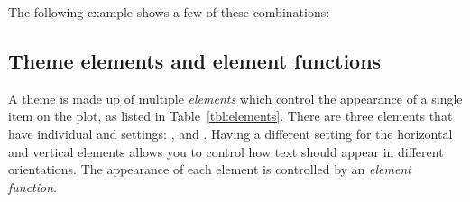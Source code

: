 \noindent The following example shows a few of these combinations:

% 
% 
% 
% 


\subsection{Theme elements and element functions}
\label{sec:theme_elements}

A theme is made up of multiple \emph{elements} which control the appearance of a single item on the plot, as listed in Table~\ref{tbl:elements}. There are three elements that have individual  and  settings: ,  and . Having a different setting for the horizontal and vertical elements allows you to control how text should appear in different orientations. The appearance of each element is controlled by an \emph{element function}. 

